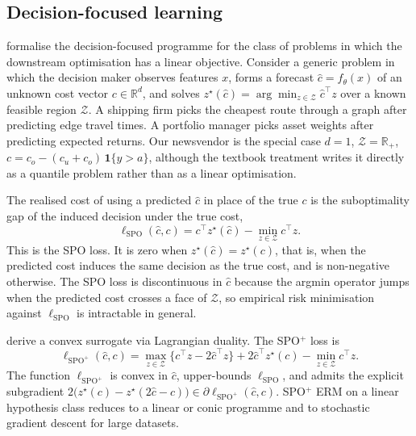 \subsection{Decision-focused learning}
\label{sec:dfl}

\citet{ElmachtoubGrigas2022} formalise the decision-focused programme for
the class of problems in which the downstream optimisation has a linear
objective. Consider a generic problem in which the decision maker observes
features $x$, forms a forecast $\hat c = f_\theta(x)$ of an unknown cost
vector $c \in \mathbb R^d$, and solves
$z^\star(\hat c) = \arg\min_{z \in \mathcal Z} \hat c^\top z$ over a known
feasible region $\mathcal Z$. A shipping firm picks the cheapest route
through a graph after predicting edge travel times. A portfolio manager
picks asset weights after predicting expected returns. Our newsvendor is
the special case $d = 1$, $\mathcal Z = \mathbb R_+$,
$c = c_o - (c_u + c_o)\, \mathbf 1\{y > a\}$, although the textbook
treatment writes it directly as a quantile problem rather than as a linear
optimisation.

The realised cost of using a predicted $\hat c$ in place of the true $c$
is the suboptimality gap of the induced decision under the true cost,
\begin{equation}
\ell_{\mathrm{SPO}}(\hat c, c)
= c^\top z^\star(\hat c) - \min_{z \in \mathcal Z} c^\top z.
\label{eq:spo_loss}
\end{equation}
This is the SPO loss. It is zero when $z^\star(\hat c) = z^\star(c)$, that
is, when the predicted cost induces the same decision as the true cost,
and is non-negative otherwise. The SPO loss is discontinuous in $\hat c$
because the argmin operator jumps when the predicted cost crosses a face
of $\mathcal Z$, so empirical risk minimisation against $\ell_{\mathrm{SPO}}$
is intractable in general.

\citet{ElmachtoubGrigas2022} derive a convex surrogate via Lagrangian
duality. The SPO$^+$ loss is
\begin{equation}
\ell_{\mathrm{SPO}^+}(\hat c, c)
= \max_{z \in \mathcal Z}\bigl\{ c^\top z - 2 \hat c^\top z \bigr\}
  + 2 \hat c^\top z^\star(c) - \min_{z \in \mathcal Z} c^\top z.
\label{eq:spo_plus_loss}
\end{equation}
The function $\ell_{\mathrm{SPO}^+}$ is convex in $\hat c$, upper-bounds
$\ell_{\mathrm{SPO}}$, and admits the explicit subgradient
$2\bigl(z^\star(c) - z^\star(2 \hat c - c)\bigr) \in
\partial \ell_{\mathrm{SPO}^+}(\hat c, c)$. SPO$^+$ ERM on a linear
hypothesis class reduces to a linear or conic programme and to stochastic
gradient descent for large datasets.

